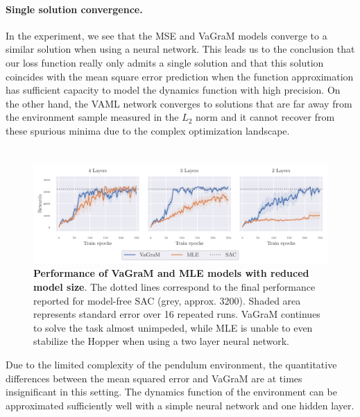 \paragraph{Single solution convergence.}
In the experiment, we see that the MSE and VaGraM models converge to a similar solution when using a neural network. 
This leads us to the conclusion that our loss function really only admits a single solution and that this solution coincides with the mean square error prediction when the function approximation has sufficient capacity to model the dynamics function with high precision.
On the other hand, the VAML network converges to solutions that are far away from the environment sample measured in the $L_2$ norm and it cannot recover from these spurious minima due to the complex optimization landscape.


\section{}

\begin{figure}[t]
\begin{center}
    \includegraphics[clip, trim=0.2cm 0.0cm 0.4cm 0.0cm, width=1.\linewidth]{figures/vagram/fig_2.pdf}
\end{center}
    \caption{\textbf{Performance of VaGraM and MLE models with reduced model size}. The dotted lines correspond to the final performance reported for model-free SAC (grey, approx. 3200). Shaded area represents standard error over 16 repeated runs. VaGraM continues to solve the task almost unimpeded, while MLE is unable to even stabilize the Hopper when using a two layer neural network.}
    \label{fig:pendulum_small}
\end{figure}
Due to the limited complexity of the pendulum environment, the quantitative differences between the mean squared error and VaGraM are at times insignificant in this setting.
The dynamics function of the environment can be approximated sufficiently well with a simple neural network and one hidden layer.

